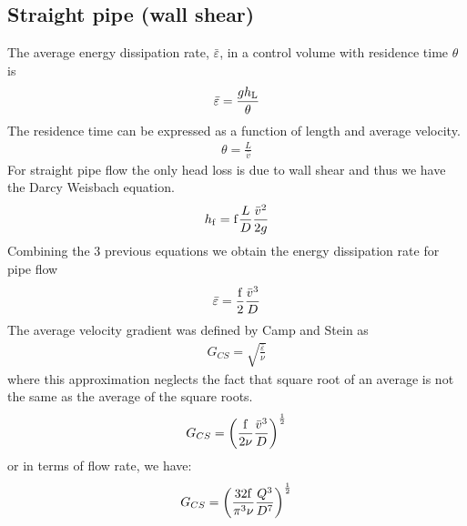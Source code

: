 \documentclass[letterpaper,10pt,english]{sphinxmanual}
\begin{document}
\subsection{Straight pipe (wall shear)}
\label{\detokenize{Rapid_Mix/RM_Derivations:straight-pipe-wall-shear}}\label{\detokenize{Rapid_Mix/RM_Derivations:heading-straight-pipe-wall-shear}}
The average energy dissipation rate, \(\bar\varepsilon\), in a control volume with residence time \(\theta\) is
\begin{equation}\label{equation:Rapid_Mix/RM_Derivations:eq_EDR_straight_pipe}
\begin{split} \bar\varepsilon = \frac{gh_{\rm{L}}}{\theta}\end{split}
\end{equation}
The residence time can be expressed as a function of length and average velocity.
\begin{equation}\label{equation:Rapid_Mix/RM_Derivations:Rapid_Mix/RM_Derivations:50}
\begin{split}\theta = \frac{L}{\bar v}\end{split}
\end{equation}
For straight pipe flow the only head loss is due to wall shear and thus we have the Darcy Weisbach equation.
\begin{equation}\label{equation:Rapid_Mix/RM_Derivations:Rapid_Mix/RM_Derivations:51}
\begin{split}h_{{\rm f}} = {{\rm f}} \frac{L}{D} \frac{\bar v^2}{2g}\end{split}
\end{equation}
Combining the 3 previous equations we obtain the energy dissipation rate for pipe flow
\begin{equation}\label{equation:Rapid_Mix/RM_Derivations:Rapid_Mix/RM_Derivations:52}
\begin{split}\bar\varepsilon = \frac{{\rm f}}{2} \frac{\bar v^3}{D}\end{split}
\end{equation}
The average velocity gradient was defined by Camp and Stein as
\begin{equation}\label{equation:Rapid_Mix/RM_Derivations:Rapid_Mix/RM_Derivations:53}
\begin{split}G_{CS} = \sqrt{\frac{\bar \varepsilon}{\nu}}\end{split}
\end{equation}
where this approximation neglects the fact that square root of an average is not the same as the average of the square roots.
\begin{equation}\label{equation:Rapid_Mix/RM_Derivations:Rapid_Mix/RM_Derivations:54}
\begin{split}G_{CS} = \left(\frac{{\rm f}}{2\nu} \frac{\bar v^3}{D} \right)^\frac{1}{2}\end{split}
\end{equation}
or in terms of flow rate, we have:
\begin{equation}\label{equation:Rapid_Mix/RM_Derivations:Rapid_Mix/RM_Derivations:55}
\begin{split}G_{CS} = \left(\frac{\rm{32f}}{ \pi^3\nu} \frac{Q^3}{D^7} \right)^\frac{1}{2}\end{split}
\end{equation}
\end{document}
